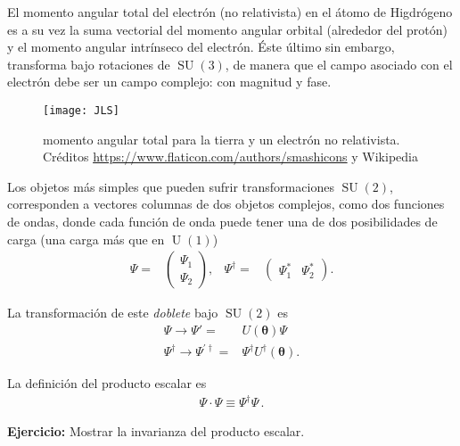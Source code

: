 El momento angular total del electrón (no relativista) en el átomo de Higdrógeno es a su vez la suma vectorial del momento angular orbital (alrededor del protón) y el momento angular intrínseco del electrón.  Éste último sin embargo, transforma bajo rotaciones de $\operatorname{SU}(3)$, de manera que el campo asociado con el electrón debe ser un campo complejo: con magnitud y fase.

\begin{frame}
\begin{figure}
  \centering
  \texttt{[image: JLS]}
  \caption[tierra electrón]{momento angular total para la tierra y un electrón no relativista. \tiny{Créditos \url{https://www.flaticon.com/authors/smashicons} y Wikipedia}}
  \label{fig:ee}
\end{figure}
\end{frame}


\begin{frame}
Los objetos más simples que pueden sufrir transformaciones  $\operatorname{SU}(2)$, corresponden a vectores columnas de dos objetos complejos, como dos funciones de ondas, donde cada función de onda puede tener una de dos posibilidades de carga (una carga más que en $\operatorname{U}(1)$)
\begin{align}
  \Psi=&
  \begin{pmatrix}
    \Psi_1\\
    \Psi_2
  \end{pmatrix},&
  \Psi^{\dagger}=&
  \begin{pmatrix}
    \Psi_1^{*} &
    \Psi_2^{*}
  \end{pmatrix}.                  
\end{align}

La transformación de este \emph{doblete} bajo $\operatorname{SU}(2)$ es
\begin{align}
  \Psi\to \Psi'=& U(\boldsymbol{\theta}) \Psi \nonumber\\
  \Psi^{\dagger}\to \Psi^{\prime\dagger} =& \Psi^{\dagger}U^{\dagger}(\boldsymbol{\theta}).
\end{align}
\end{frame}

La definición del producto escalar es
\begin{align}
   \Psi\cdot \Psi \equiv \Psi^{\dagger}\Psi\,. 
\end{align}

\textbf{Ejercicio:} Mostrar la invarianza del producto escalar.


